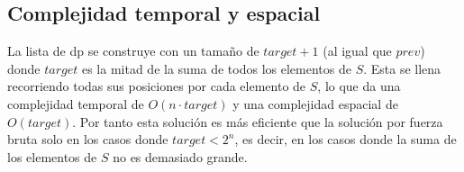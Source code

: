 \documentclass[11pt]{article}
\begin{document}
    \subsection{Complejidad temporal y espacial}
    La lista de dp se construye con un tamaño de $target + 1$ (al igual que $prev$) donde $target$ es la mitad
    de la suma de todos los elementos de $S$. Esta se llena recorriendo todas sus posiciones por cada elemento
    de $S$, lo que da una complejidad temporal de $O(n \cdot target)$ y una complejidad espacial de $O(target)$.
    Por tanto esta solución es más eficiente que la solución por fuerza bruta solo en los casos donde $target < 2^n$,
    es decir, en los casos donde la suma de los elementos de $S$ no es demasiado grande.
    
\end{document}
